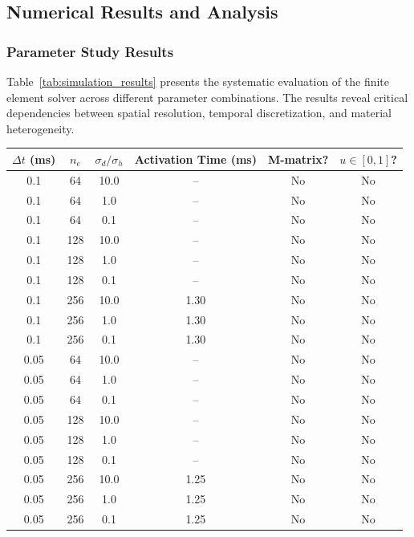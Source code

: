 \subsection{Numerical Results and Analysis}

\subsubsection{Parameter Study Results}

Table~\ref{tab:simulation_results} presents the systematic evaluation of the finite element solver across different parameter combinations. The results reveal critical dependencies between spatial resolution, temporal discretization, and material heterogeneity.

\begin{table}[H]
\centering
\begin{tabular}{cccccc}
    \toprule
    $\Delta t$ (ms) & $n_e$ & $\sigma_d/\sigma_h$ & Activation Time (ms) & M-matrix? & $u \in [0,1]$? \\
    \midrule
    0.1 & 64  & 10.0 & --     & No  & No \\
    0.1 & 64  & 1.0  & --     & No  & No \\
    0.1 & 64  & 0.1  & --     & No  & No \\
    0.1 & 128 & 10.0 & --     & No  & No \\
    0.1 & 128 & 1.0  & --     & No  & No \\
    0.1 & 128 & 0.1  & --     & No  & No \\
    0.1 & 256 & 10.0 & 1.30   & No  & No \\
    0.1 & 256 & 1.0  & 1.30   & No  & No \\
    0.1 & 256 & 0.1  & 1.30   & No  & No \\
    0.05 & 64  & 10.0 & --     & No  & No \\
    0.05 & 64  & 1.0  & --     & No  & No \\
    0.05 & 64  & 0.1  & --     & No  & No \\
    0.05 & 128 & 10.0 & --     & No  & No \\
    0.05 & 128 & 1.0  & --     & No  & No \\
    0.05 & 128 & 0.1  & --     & No  & No \\
    0.05 & 256 & 10.0 & 1.25   & No  & No \\
    0.05 & 256 & 1.0  & 1.25   & No  & No \\
    0.05 & 256 & 0.1  & 1.25   & No  & No \\

\end{tabular}
\end{table}
